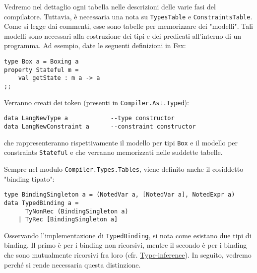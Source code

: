 \documentclass[10pt,a4paper]{article}
\begin{document}
Vedremo nel dettaglio ogni tabella nelle descrizioni delle varie fasi del compilatore. Tuttavia, è necessaria una nota
su \texttt{TypesTable} e \texttt{ConstraintsTable}. Come si legge dai commenti, esse sono tabelle per memorizzare dei
"modelli". Tali modelli sono necessari alla costruzione dei tipi e dei predicati all'interno di un programma. Ad esempio,
date le seguenti definizioni in Fex:
\begin{lstlisting}
type Box a = Boxing a
property Stateful m =
    val getState : m a -> a
;;
\end{lstlisting}
Verranno creati dei token (presenti in \texttt{Compiler.Ast.Typed}):
\begin{lstlisting}
data LangNewType a            --type constructor
data LangNewConstraint a      --constraint constructor
\end{lstlisting}
che rappresenteranno rispettivamente il modello per tipi \texttt{Box} e il modello per constraints \texttt{Stateful} e che
verranno memorizzati nelle suddette tabelle.

Sempre nel modulo \texttt{Compiler.Types.Tables}, viene definito anche il cosiddetto "binding tipato":
\begin{lstlisting}
type BindingSingleton a = (NotedVar a, [NotedVar a], NotedExpr a)
data TypedBinding a =
      TyNonRec (BindingSingleton a)
    | TyRec [BindingSingleton a]
\end{lstlisting}
Osservando l'implementazione di \texttt{TypedBinding}, si nota come esistano due tipi di binding. Il primo è per i binding
non ricorsivi, mentre il secondo è per i binding che sono mutualmente ricorsivi fra loro
(cfr. \hyperlink{Type-inference}{Type-inference}). In seguito, vedremo perché si rende necessaria questa distinzione.
\end{document}
